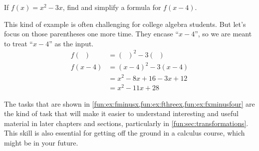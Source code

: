 \begin{pccexample}\label{fun:ex:fxminusfour}
If $f(x)=x^2-3x$, find and simplify a formula for $f(x-4)$.
\begin{pccsolution}
This kind of example is often challenging for college algebra students. But let's focus on those parentheses one more time. They encase ``$x-4$'', so we are meant to treat ``$x-4$'' as the input. 
\begin{align*}
f(\phantom{x})&=(\phantom{x})^2-3(\phantom{x})\\
f(x-4)&=(x-4)^2-3(x-4)\\
&=x^2-8x+16-3x+12\\
&=x^2-11x+28
\end{align*}
\end{pccsolution}
\end{pccexample}

The tasks that are shown in \cref{fun:ex:fminusx,fun:ex:fthreex,fun:ex:fxminusfour} are the kind of task that will make it easier to understand interesting and useful material in later chapters and sections, particularly in \cref{fun:sec:transformations}. This skill is also essential for getting off the ground in a calculus course, which might be in your future.

